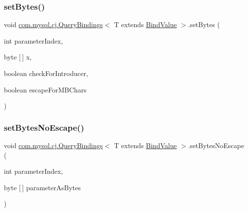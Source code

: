 \subsubsection{\texorpdfstring{set\+Bytes()}{setBytes()}\hspace{0.1cm}{\footnotesize\ttfamily [2/2]}}
{\footnotesize\ttfamily void \mbox{\hyperlink{interfacecom_1_1mysql_1_1cj_1_1_query_bindings}{com.\+mysql.\+cj.\+Query\+Bindings}}$<$ T extends \mbox{\hyperlink{interfacecom_1_1mysql_1_1cj_1_1_bind_value}{Bind\+Value}} $>$.set\+Bytes (\begin{DoxyParamCaption}\item[{int}]{parameter\+Index,  }\item[{byte \mbox{[}$\,$\mbox{]}}]{x,  }\item[{boolean}]{check\+For\+Introducer,  }\item[{boolean}]{escape\+For\+M\+B\+Chars }\end{DoxyParamCaption})}

\mbox{\label{interfacecom_1_1mysql_1_1cj_1_1_query_bindings_aa92daa6a1d23b167bc0400bfa3a82012}} 
\subsubsection{\texorpdfstring{set\+Bytes\+No\+Escape()}{setBytesNoEscape()}}
{\footnotesize\ttfamily void \mbox{\hyperlink{interfacecom_1_1mysql_1_1cj_1_1_query_bindings}{com.\+mysql.\+cj.\+Query\+Bindings}}$<$ T extends \mbox{\hyperlink{interfacecom_1_1mysql_1_1cj_1_1_bind_value}{Bind\+Value}} $>$.set\+Bytes\+No\+Escape (\begin{DoxyParamCaption}\item[{int}]{parameter\+Index,  }\item[{byte \mbox{[}$\,$\mbox{]}}]{parameter\+As\+Bytes }\end{DoxyParamCaption})}

\mbox{\label{interfacecom_1_1mysql_1_1cj_1_1_query_bindings_aa6db593647f534f2788e3b8da618b9c2}} 
